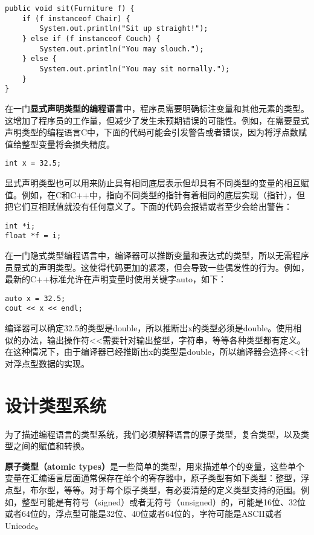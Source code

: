 \documentclass[cn,11pt,chinese]{elegantbook}
\begin{document}
\begin{verbatim}
public void sit(Furniture f) {
    if (f instanceof Chair) {
        System.out.println("Sit up straight!");
    } else if (f instanceof Couch) {
        System.out.println("You may slouch.");
    } else {
        System.out.println("You may sit normally.");
    }
}
\end{verbatim}

在一门\textbf{显式声明类型的编程语言}中，程序员需要明确标注变量和其他元素的类型。这增加了程序员的工作量，但减少了发生未预期错误的可能性。例如，在需要显式声明类型的编程语言C中，下面的代码可能会引发警告或者错误，因为将浮点数赋值给整型变量将会损失精度。

\begin{verbatim}
int x = 32.5;
\end{verbatim}

显式声明类型也可以用来防止具有相同底层表示但却具有不同类型的变量的相互赋值。例如，在C和C++中，指向不同类型的指针有着相同的底层实现（指针），但把它们互相赋值就没有任何意义了。下面的代码会报错或者至少会给出警告：

\begin{verbatim}
int *i;
float *f = i;
\end{verbatim}

在一门隐式类型编程语言中，编译器可以推断变量和表达式的类型，所以无需程序员显式的声明类型。这使得代码更加的紧凑，但会导致一些偶发性的行为。例如，最新的C++标准允许在声明变量时使用关键字auto，如下：

\begin{verbatim}
auto x = 32.5;
cout << x << endl;
\end{verbatim}

编译器可以确定32.5的类型是double，所以推断出x的类型必须是double。使用相似的办法，输出操作符<<需要针对输出整型，字符串，等等各种类型都有定义。在这种情况下，由于编译器已经推断出x的类型是double，所以编译器会选择<<针对浮点型数据的实现。

\section{设计类型系统}

为了描述编程语言的类型系统，我们必须解释语言的原子类型，复合类型，以及类型之间的赋值和转换。

\textbf{原子类型（atomic types）}是一些简单的类型，用来描述单个的变量，这些单个变量在汇编语言层面通常保存在单个的寄存器中，原子类型有如下类型：整型，浮点型，布尔型，等等。对于每个原子类型，有必要清楚的定义类型支持的范围。例如，整型可能是有符号（signed）或者无符号（unsigned）的，可能是16位、32位或者64位的，浮点型可能是32位、40位或者64位的，字符可能是ASCII或者Unicode。
\end{document}
